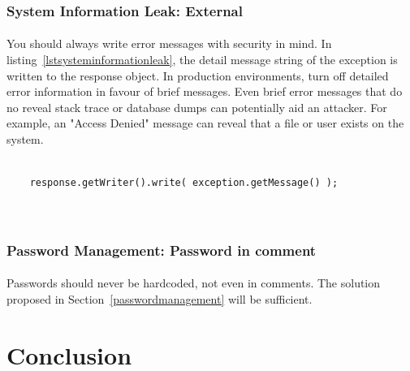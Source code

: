 \documentclass[11pt,english,a4paper]{report}
\begin{document}
\subsubsection{System Information Leak: External}
\paragraph{}
You should always write error messages with security in mind.
In listing~\ref{lstsysteminformationleak}, the detail message string of the exception is written to the response object.
In production environments, turn off detailed error information in favour of brief messages.
Even brief error messages that do no reveal stack trace or database dumps can potentially aid an attacker. 
For example, an "Access Denied" message can reveal that a file or user exists on the system.

\begin{lstlisting}[caption=Parts of the method mapException, label=lstsysteminformationleak]
	
	response.getWriter().write( exception.getMessage() );

	
\end{lstlisting}

\subsubsection{Password Management: Password in comment}
\paragraph{}
Passwords should never be hardcoded, not even in comments.
The solution proposed in Section~\ref{passwordmanagement} will be sufficient.


\section{Conclusion}
\paragraph{}

\newpage




\end{document}
